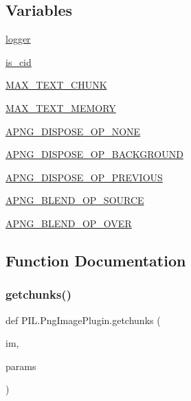 \subsection*{Variables}
\begin{DoxyCompactItemize}
\item 
\hyperlink{namespacePIL_1_1PngImagePlugin_abe480628a6c283d526159063d5caad2b}{logger}
\item 
\hyperlink{namespacePIL_1_1PngImagePlugin_a315b7a0cdb90159ff45dda5f8d5811e4}{is\+\_\+cid}
\item 
\hyperlink{namespacePIL_1_1PngImagePlugin_a3a1635039917cf010fda3c528857fc1c}{M\+A\+X\+\_\+\+T\+E\+X\+T\+\_\+\+C\+H\+U\+NK}
\item 
\hyperlink{namespacePIL_1_1PngImagePlugin_adafb70efb67ebc31b92da43704112867}{M\+A\+X\+\_\+\+T\+E\+X\+T\+\_\+\+M\+E\+M\+O\+RY}
\item 
\hyperlink{namespacePIL_1_1PngImagePlugin_a146b3828b95f9d9051a05ccd9a23d2a6}{A\+P\+N\+G\+\_\+\+D\+I\+S\+P\+O\+S\+E\+\_\+\+O\+P\+\_\+\+N\+O\+NE}
\item 
\hyperlink{namespacePIL_1_1PngImagePlugin_aacaf2f8c1e274d71fc80aa27a7e0dbf9}{A\+P\+N\+G\+\_\+\+D\+I\+S\+P\+O\+S\+E\+\_\+\+O\+P\+\_\+\+B\+A\+C\+K\+G\+R\+O\+U\+ND}
\item 
\hyperlink{namespacePIL_1_1PngImagePlugin_a4574bfa4734e8b9ed3b75e70eaafb253}{A\+P\+N\+G\+\_\+\+D\+I\+S\+P\+O\+S\+E\+\_\+\+O\+P\+\_\+\+P\+R\+E\+V\+I\+O\+US}
\item 
\hyperlink{namespacePIL_1_1PngImagePlugin_a932fa0264cdf675ca2eeec5890fe314d}{A\+P\+N\+G\+\_\+\+B\+L\+E\+N\+D\+\_\+\+O\+P\+\_\+\+S\+O\+U\+R\+CE}
\item 
\hyperlink{namespacePIL_1_1PngImagePlugin_add8e03ad94f0ea0c52288e40cc5c06ac}{A\+P\+N\+G\+\_\+\+B\+L\+E\+N\+D\+\_\+\+O\+P\+\_\+\+O\+V\+ER}
\end{DoxyCompactItemize}


\subsection{Function Documentation}
\mbox{\label{namespacePIL_1_1PngImagePlugin_af5721b5beee36ef77f780386f738ab11}} 
\subsubsection{\texorpdfstring{getchunks()}{getchunks()}}
{\footnotesize\ttfamily def P\+I\+L.\+Png\+Image\+Plugin.\+getchunks (\begin{DoxyParamCaption}\item[{}]{im,  }\item[{}]{params }\end{DoxyParamCaption})}

